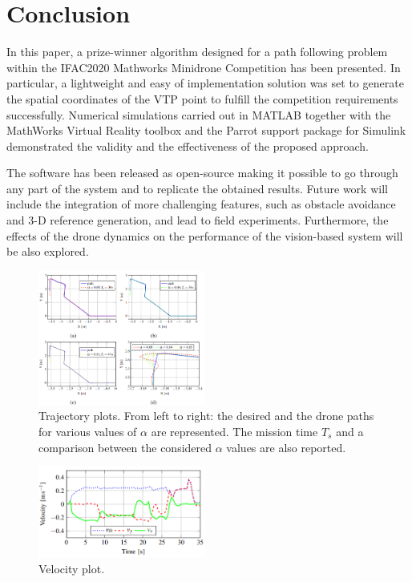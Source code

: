\documentclass[a4paper,twocolumn,10pt]{article}
\begin{document}
    \section{Conclusion}
    \label{sec:conclu}
    In this paper, a prize-winner algorithm designed for a path following problem within the IFAC2020 Mathworks Minidrone Competition has been presented. In particular, a lightweight and easy of implementation solution was set to generate the spatial coordinates of the VTP point to fulfill the competition requirements successfully. Numerical simulations carried out in MATLAB together with the MathWorks Virtual Reality toolbox and the Parrot support package for Simulink demonstrated the validity and the effectiveness of the proposed approach. 

    The software has been released as open-source making it possible to go through any part of the system and to replicate the obtained results. Future work will include the integration of more challenging features, such as obstacle avoidance and 3-D reference generation, and lead to field experiments. Furthermore, the effects of the drone dynamics on the performance of the vision-based system will be also explored. 

    \begin{figure}
        \centering
        \includegraphics[width=0.49\textwidth]{pics/fig10_graph.png}
        \caption{Trajectory plots. From left to right: the desired and the drone paths for various values of $\alpha$ are represented. The mission time $T_s$ and a comparison between the considered $\alpha$ values are also reported.}
        \label{fig:fig10graphs}
    \end{figure}
    \begin{figure}
        \centering
        \includegraphics[width=0.49\textwidth]{pics/fig11_graph.png}
        \caption{Velocity plot.}
        \label{fig:fig11graph}
    \end{figure}
\end{document}
